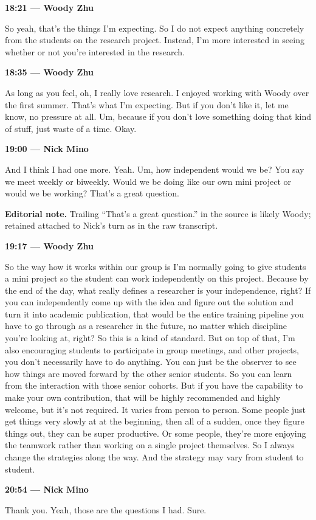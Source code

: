 \documentclass[11pt]{article}
\newcommand{\Turn}[2]{%
  \medskip\noindent\textbf{#1 --- #2}\par\nobreak\noindent\ignorespaces
}
\newcommand{\Editorial}[1]{%
  \par\medskip\noindent\textcolor{editorial}{\textbf{Editorial note.} #1}\par\medskip
}
\begin{document}
\Turn{18:21}{Woody Zhu}
So yeah, that's the things I'm expecting. So I do not expect anything
concretely from the students on the research project. Instead, I'm more
interested in seeing whether or not you're interested in the research.

\Turn{18:35}{Woody Zhu}
As long as you feel, oh, I really love research. I enjoyed working with Woody
over the first summer. That's what I'm expecting. But if you don't like it, let
me know, no pressure at all. Um, because if you don't love something doing that
kind of stuff, just waste of a time. Okay.

\Turn{19:00}{Nick Mino}
And I think I had one more. Yeah. Um, how independent would we be? You say we
meet weekly or biweekly. Would we be doing like our own mini project or would
we be working? That's a great question.

\Editorial{Trailing ``That's a great question.'' in the source is likely Woody;
retained attached to Nick's turn as in the raw transcript.}

\Turn{19:17}{Woody Zhu}
So the way how it works within our group is I'm normally going to give students
a mini project so the student can work independently on this project. Because
by the end of the day, what really defines a researcher is your independence,
right? If you can independently come up with the idea and figure out the
solution and turn it into academic publication, that would be the entire
training pipeline you have to go through as a researcher in the future, no
matter which discipline you're looking at, right? So this is a kind of
standard. But on top of that, I'm also encouraging students to participate in
group meetings, and other projects, you don't necessarily have to do anything.
You can just be the observer to see how things are moved forward by the other
senior students. So you can learn from the interaction with those senior
cohorts. But if you have the capability to make your own contribution, that
will be highly recommended and highly welcome, but it's not required. It varies
from person to person. Some people just get things very slowly at at the
beginning, then all of a sudden, once they figure things out, they can be super
productive. Or some people, they're more enjoying the teamwork rather than
working on a single project themselves. So I always change the strategies along
the way. And the strategy may vary from student to student.

\Turn{20:54}{Nick Mino}
Thank you. Yeah, those are the questions I had. Sure.
\end{document}
